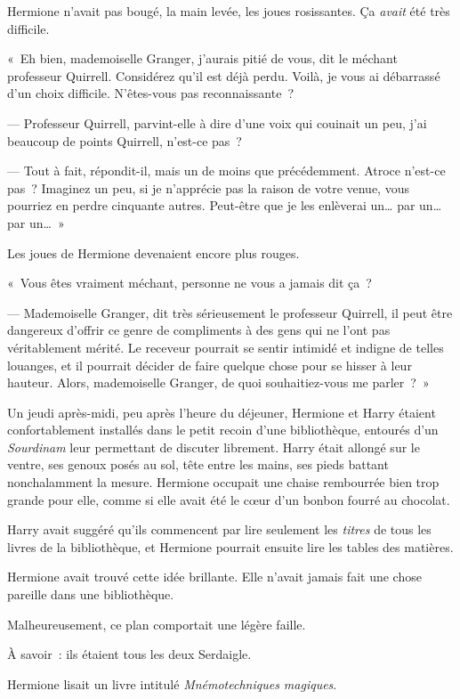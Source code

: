 Hermione n'avait pas bougé, la main levée, les joues rosissantes. Ça \emph{avait} été très difficile.

«~Eh bien, mademoiselle Granger, j'aurais pitié de vous, dit le méchant professeur Quirrell. Considérez qu'il est déjà perdu. Voilà, je vous ai débarrassé d'un choix difficile. N'êtes-vous pas reconnaissante~?

--- Professeur Quirrell, parvint-elle à dire d'une voix qui couinait un peu, j'ai beaucoup de points Quirrell, n'est-ce pas~?

--- Tout à fait, répondit-il, mais un de moins que précédemment. Atroce n'est-ce pas~? Imaginez un peu, si je n'apprécie pas la raison de votre venue, vous pourriez en perdre cinquante autres. Peut-être que je les enlèverai un… par un… par un…~»

Les joues de Hermione devenaient encore plus rouges.

«~Vous êtes vraiment méchant, personne ne vous a jamais dit ça~?

--- Mademoiselle Granger, dit très sérieusement le professeur Quirrell, il peut être dangereux d'offrir ce genre de compliments à des gens qui ne l'ont pas véritablement mérité. Le receveur pourrait se sentir intimidé et indigne de telles louanges, et il pourrait décider de faire quelque chose pour se hisser à leur hauteur. Alors, mademoiselle Granger, de quoi souhaitiez-vous me parler~?~»

\later

Un jeudi après-midi, peu après l'heure du déjeuner, Hermione et Harry étaient confortablement installés dans le petit recoin d'une bibliothèque, entourés d'un \emph{Sourdinam} leur permettant de discuter librement. Harry était allongé sur le ventre, ses genoux posés au sol, tête entre les mains, ses pieds battant nonchalamment la mesure. Hermione occupait une chaise rembourrée bien trop grande pour elle, comme si elle avait été le cœur d'un bonbon fourré au chocolat.

Harry avait suggéré qu'ils commencent par lire seulement les \emph{titres} de tous les livres de la bibliothèque, et Hermione pourrait ensuite lire les tables des matières.

Hermione avait trouvé cette idée brillante. Elle n'avait jamais fait une chose pareille dans une bibliothèque.

Malheureusement, ce plan comportait une légère faille.

À savoir~: ils étaient tous les deux Serdaigle.

Hermione lisait un livre intitulé \emph{Mnémotechniques magiques}.

